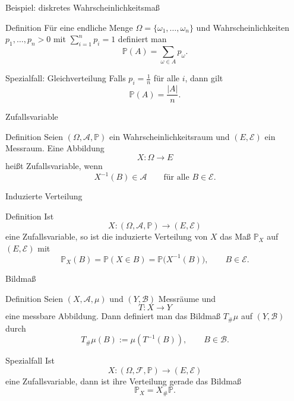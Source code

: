 \documentclass{beamer}
\begin{document}
\begin{frame}{Beispiel: diskretes Wahrscheinlichkeitsmaß}
\begin{block}{Definition}
Für eine endliche Menge \(\Omega=\{\omega_1,\ldots,\omega_n\}\) und Wahrscheinlichkeiten
\(p_1,\ldots,p_n>0\) mit \(\sum_{i=1}^n p_i=1\) definiert man
\[
\mathbb P(A)=\sum_{\omega\in A} p_\omega.
\]
\end{block}

\begin{block}{Spezialfall: Gleichverteilung}
Falls \(p_i=\frac1n\) für alle \(i\), dann gilt
\[
\mathbb P(A)=\frac{|A|}{n}.
\]
\end{block}
\end{frame}

\begin{frame}{Zufallsvariable}
\begin{block}{Definition}
Seien \((\Omega,\mathcal A,\mathbb P)\) ein Wahrscheinlichkeitsraum und \((E,\mathcal E)\) ein Messraum.
Eine Abbildung
\[
X\colon \Omega \to E
\]
hei\ss{}t Zufallsvariable, wenn
\[
X^{-1}(B)\in\mathcal A
\qquad
\text{für alle } B\in\mathcal E.
\]
\end{block}
\end{frame}

\begin{frame}{Induzierte Verteilung}
\begin{block}{Definition}
Ist
\[
X\colon (\Omega,\mathcal A,\mathbb P)\to(E,\mathcal E)
\]
eine Zufallsvariable, so ist die induzierte Verteilung von \(X\) das Maß \(\mathbb P_X\) auf \((E,\mathcal E)\) mit
\[
\mathbb P_X(B)=\mathbb P(X\in B)=\mathbb P\bigl(X^{-1}(B)\bigr),
\qquad B\in\mathcal E.
\]
\end{block}
\end{frame}

\begin{frame}{Bildmaß}
\begin{block}{Definition}
Seien \((X,\mathcal A,\mu)\) und \((Y,\mathcal B)\) Messräume und
\[
T\colon X\to Y
\]
eine messbare Abbildung.
Dann definiert man das Bildmaß \(T_\#\mu\) auf \((Y,\mathcal B)\) durch
\[
T_\#\mu(B):=\mu(T^{-1}(B)),
\qquad B\in\mathcal B.
\]
\end{block}

\begin{block}{Spezialfall}
Ist
\[
X\colon (\Omega,\mathcal F,\mathbb P)\to(E,\mathcal E)
\]
eine Zufallsvariable, dann ist ihre Verteilung gerade das Bildmaß
\[
\mathbb P_X=X_\#\mathbb P.
\]
\end{block}
\end{frame}
\end{document}
